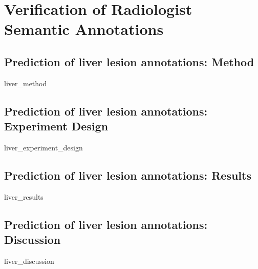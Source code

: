 \chapter{Verification of Radiologist Semantic Annotations}

\section{Prediction of liver lesion annotations: Method}
{liver_method}
\clearpage

\section{Prediction of liver lesion annotations: Experiment Design}
{liver_experiment_design}
\clearpage

\section{Prediction of liver lesion annotations: Results}
{liver_results}
\clearpage

\section{Prediction of liver lesion annotations: Discussion}
{liver_discussion}